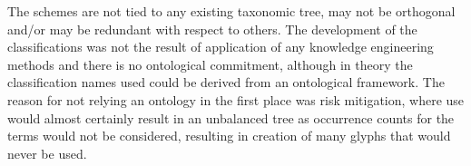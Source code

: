 \begin{table}[t]
\begin{center}
\caption{A fragment of the input document passed to the taxonomy generation algorithm. Schemes are grouped by common names preceding the semi-colon, e.g. \emph{S1:On Material} refers to schema 1 and \emph{On Material} is the classification.}
\vspace{1mm}
\end{center}
\vspace{-5mm}
\label{tab:input-fragment}
\end{table}

The schemes are not tied to any existing taxonomic tree, may not be orthogonal and/or may be redundant with respect to others. The development of the classifications was not the result of application of any knowledge engineering methods and there is no ontological commitment, although in theory the classification names used could be derived from an ontological framework. The reason for not relying an ontology in the first place was risk mitigation, where use would almost certainly result in an unbalanced tree as occurrence counts for the terms would not be considered, resulting in creation of many glyphs that would never be used. 

